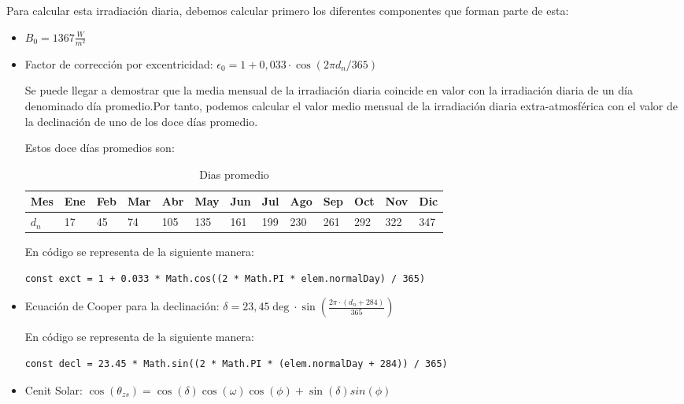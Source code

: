 Para calcular esta irradiación diaria, debemos calcular primero los diferentes componentes que forman parte de esta:
\begin{itemize}
\item $B_{0} = 1367 \frac{W}{m^2}$
\item Factor de corrección por excentricidad: $\epsilon_0 = 1 + 0,033 \cdot \cos(2 \pi d_n / 365)$

Se puede llegar a demostrar que la media mensual de la irradiación diaria coincide en valor con la irradiación diaria de un día denominado día promedio.Por tanto, podemos calcular el valor medio mensual de la irradiación diaria extra-atmosférica con el valor de la declinación de uno de los doce días promedio.

Estos doce días promedios son:

\begin{table}[ht]
\label{tab:dias_promedio}
\centering
\begin{tabular}{|l|l|l|l|l|l|l|l|l|l|l|l|l|}
\hline
Mes   & Ene & Feb & Mar & Abr & May & Jun & Jul & Ago & Sep & Oct & Nov & Dic \\ \hline
$d_n$ & 17  & 45  & 74  & 105  & 135  & 161  & 199  & 230  & 261  & 292  & 322 & 347  \\ \hline
\end{tabular}
\caption{Dias promedio}
\end{table}

En código se representa de la siguiente manera:
\begin{lstlisting}[style=ES6, caption={Factor de corrección por excentricidad}]
		const exct = 1 + 0.033 * Math.cos((2 * Math.PI * elem.normalDay) / 365)
\end{lstlisting}
\item Ecuación de Cooper para la declinación: $\delta = 23,45\deg · \sin(\frac{2\pi·(d_n+284)}{365})$

En código se representa de la siguiente manera:
\begin{lstlisting}[style=ES6, caption={Ecuación de Cooper para declinación}]
		const decl = 23.45 * Math.sin((2 * Math.PI * (elem.normalDay + 284)) / 365)
\end{lstlisting}
\item Cenit Solar: $\cos(\theta_{zs}) = \cos(\delta)\cos(\omega)\cos(\phi) + \sin(\delta)sin(\phi)$\\


\end{itemize}
